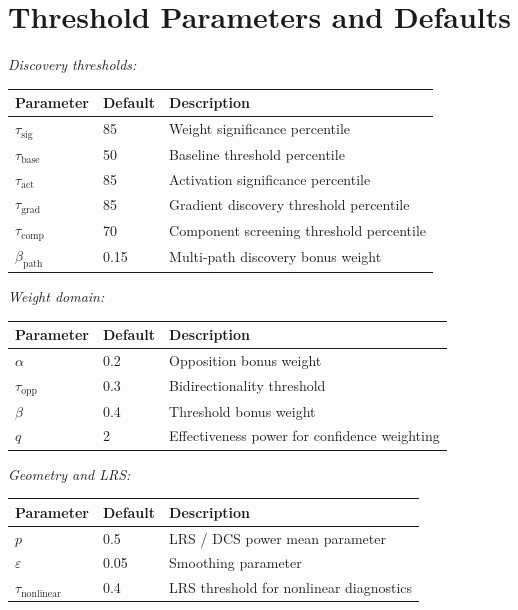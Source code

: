 \documentclass[11pt]{article}
\begin{document}
\section{Threshold Parameters and Defaults}
\label{app:thresholds}

\noindent\textit{Discovery thresholds:}
\begin{center}
\begin{tabular}{llp{}}
\toprule
\textbf{Parameter} & \textbf{Default} & \textbf{Description} \\
\midrule
$\tau_{\text{sig}}$ & 85 & Weight significance percentile \\
$\tau_{\text{base}}$ & 50 & Baseline threshold percentile \\
$\tau_{\text{act}}$ & 85 & Activation significance percentile \\
$\tau_{\text{grad}}$ & 85 & Gradient discovery threshold percentile \\
$\tau_{\text{comp}}$ & 70 & Component screening threshold percentile \\
$\beta_{\text{path}}$ & 0.15 & Multi-path discovery bonus weight \\
\bottomrule
\end{tabular}
\end{center}

\noindent\textit{Weight domain:}
\begin{center}
\begin{tabular}{llp{}}
\toprule
\textbf{Parameter} & \textbf{Default} & \textbf{Description} \\
\midrule
$\alpha$ & 0.2 & Opposition bonus weight \\
$\tau_{\text{opp}}$ & 0.3 & Bidirectionality threshold \\
$\beta$ & 0.4 & Threshold bonus weight \\
$q$ & 2 & Effectiveness power for confidence weighting \\
\bottomrule
\end{tabular}
\end{center}

\noindent\textit{Geometry and LRS:}
\begin{center}
\begin{tabular}{llp{}}
\toprule
\textbf{Parameter} & \textbf{Default} & \textbf{Description} \\
\midrule
$p$ & 0.5 & LRS / DCS power mean parameter \\
$\varepsilon$ & 0.05 & Smoothing parameter \\
$\tau_{\text{nonlinear}}$ & 0.4 & LRS threshold for nonlinear diagnostics \\
\bottomrule
\end{tabular}
\end{center}
\end{document}
